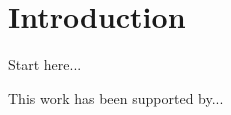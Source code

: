 
\section{Introduction}

Start here...

\begin{acks}
This work has been supported by...
\end{acks}



